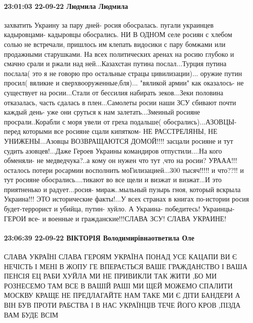 \paragraph{23:01:03 22-09-22 Людмила Людмила}

захватить Украину за пару дней- росия обосралась. пугали украинцев кадыровцами-
кадыровцы обосрались. НИ В ОДНОМ селе росиян с хлебом солью не встречали,
пришлось им клепать видосики с пару бомжами или продажными старушками. На всех
политических аренах на росию глубоко и смачно срали и ржали над ней...Казахстан
путина послал...Турция путина послала( это я не говорю про остальные страцы
цивилизации)... оружие путин просил( вяликие и сверхвооруженные,бля)...
"вяликой армии" как оказалось- не существует на росии...Стали от бессилия
набирать зеков...Зеки половина отказалась, часть сдалась в плен...Самолеты
росии наши ЗСУ сбивают почти каждый день- уже они сруться к нам
залетать...Змеиный росияне просрали..Корабли с моря увели от греха подальше(
обосрались)...АЗОВЦЫ- перед которыми все росияне сцали кипятком- НЕ
РАССТРЕЛЯНЫ, НЕ УНИЖЕНЫ...Азовцы ВОЗВРАЩАЮТСЯ ДОМОЙ!!!! засцали росияне и тут
судить азовцев!...Даже Героев Украины командиров отпустили....На кого обменяли-
не медведчука?..а кому он нужен что тут ,что на росии? УРААА!!! осталось потери
росармии восполнить моГилизацией...300 тысяч!!!!! и что??!! и тут росияне
обосрались....тикают во все щели и визжат и визжат...И это приятненько и
радует...росия- мираж..мыльный пузырь гноя, который вскрыла Украина!!! ЭТО
исторические факты!...У всех странах в книгах по-истории росия будет-террорист
и убийца, путин- хуйло. А Украина- победитесь! Украинцы- ГЕРОИ все- и военные и
гражданские!!!СЛАВА ЗСУ! СЛАВА УКРАИНЕ!

\paragraph{23:06:39 22-09-22 ВІКТОРІЯ Володимирівнаответила Оле}

СЛАВА УКРАЇНІ СЛАВА ГЕРОЯМ УКРАЇНА ПОНАД УСЕ КАЦАПИ ВИ Є НЕЧІСТЬ І МЕНІ В ЖОПУ
ГЕ ВПЕРАЄТЬСЯ ВАШЕ ГРАЖДАНСТВО І ВАША ПЕНСІЯ ЕЦ РАБИ ХУЙЛА МИ НЕ ПРИВИКЛИ ТАК
ЖИТИ ,БО МИ РОЗНЕСЕМО ТАМ ВСЕ В ВАШІЙ РАШІ МИ ЩЕЙ МОЖЕМО СПАЛИТИ МОСКВУ КРАЩЕ
НЕ ПРЕДЛАГАЙТЕ НАМ ТАКЕ МИ Є ДІТИ БАНДЕРИ А ВІН БУВ ПРОТИ РАБСТВА І В НАС
УКРАЇНЦІВ ТЕЧЕ ЙОГО КРОВ ,ПІЗДА ВАМ БУДЕ ВСІМ

